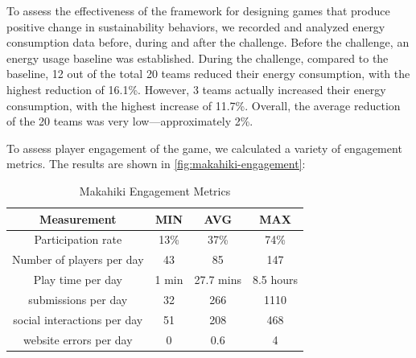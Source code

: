 \documentclass{sigchi}
\newcommand\tabhead[1]{\small\textbf{#1}}
\begin{document}
To assess the effectiveness of the framework for designing games that produce positive change in sustainability
behaviors, we recorded and analyzed energy consumption data before, during and after the
challenge.  Before the challenge, an energy usage baseline was established. During the
challenge, compared to the baseline, 12 out of the total 20 teams reduced their energy
consumption, with the highest reduction of 16.1\%. However, 3 teams actually increased
their energy consumption, with the highest increase of 11.7\%. Overall, the average
reduction of the 20 teams was very low---approximately 2\%.

To assess player engagement of the game, we calculated a variety of engagement
metrics. The results are shown in \autoref{fig:makahiki-engagement}:

\begin{table}
  \centering
  \begin{tabular}{|c|c|c|c}
    \hline
    \multicolumn{1}{|p{0.5\columnwidth}|}{\centering\tabhead{Measurement}} &
    \multicolumn{1}{|p{0.1\columnwidth}|}{\centering\tabhead{MIN}} &
    \multicolumn{1}{|p{0.1\columnwidth}|}{\centering\tabhead{AVG}} &
    \multicolumn{1}{|p{0.1\columnwidth}|}{\centering\tabhead{MAX}} \\
    \hline
    \multicolumn{1}{|p{0.5\columnwidth}|}{Participation rate} &
    \multicolumn{1}{|p{0.1\columnwidth}|}{13\%} &
    \multicolumn{1}{|p{0.1\columnwidth}|}{37\%} &
    \multicolumn{1}{|p{0.1\columnwidth}|}{74\%} \\
    \hline
    \multicolumn{1}{|p{0.5\columnwidth}|}{Number of players per day} &
    \multicolumn{1}{|p{0.1\columnwidth}|}{43} &
    \multicolumn{1}{|p{0.1\columnwidth}|}{85} &
    \multicolumn{1}{|p{0.1\columnwidth}|}{147} \\
    \hline
    \multicolumn{1}{|p{0.5\columnwidth}|}{Play time per day} &
    \multicolumn{1}{|p{0.1\columnwidth}|}{1 min} &
    \multicolumn{1}{|p{0.1\columnwidth}|}{27.7 mins} &
    \multicolumn{1}{|p{0.1\columnwidth}|}{8.5 hours} \\
    \hline
    \multicolumn{1}{|p{0.5\columnwidth}|}{submissions per day} &
    \multicolumn{1}{|p{0.1\columnwidth}|}{32} &
    \multicolumn{1}{|p{0.1\columnwidth}|}{266} &
    \multicolumn{1}{|p{0.1\columnwidth}|}{1110} \\
    \hline
    \multicolumn{1}{|p{0.5\columnwidth}|}{social interactions per day} &
    \multicolumn{1}{|p{0.1\columnwidth}|}{51} &
    \multicolumn{1}{|p{0.1\columnwidth}|}{208} &
    \multicolumn{1}{|p{0.1\columnwidth}|}{468} \\
    \hline
    \multicolumn{1}{|p{0.5\columnwidth}|}{website errors per day} &
    \multicolumn{1}{|p{0.1\columnwidth}|}{0} &
    \multicolumn{1}{|p{0.1\columnwidth}|}{0.6} &
    \multicolumn{1}{|p{0.1\columnwidth}|}{4} \\
    \hline
  \end{tabular}
  \caption{Makahiki Engagement Metrics}
  \label{fig:makahiki-engagement}
\end{table}
\end{document}
